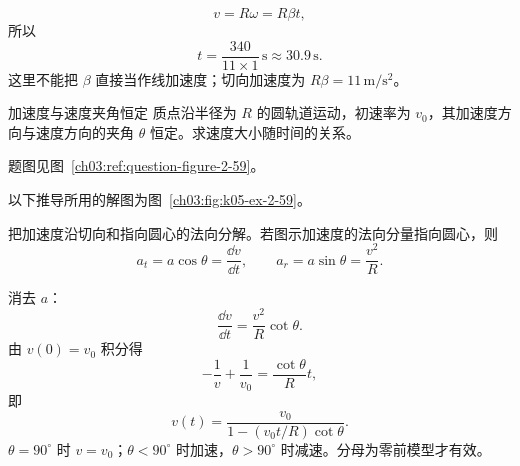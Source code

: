 {\begin{xesolution}
\[
v=R\omega=R\beta t,
\]
所以
\[
 \boxed{t=\frac{340}{11\times1}\,\mathrm s\approx30.9\,\mathrm s}.
\]
这里不能把 $\beta$ 直接当作线加速度；切向加速度为 $R\beta=11\,\mathrm{m/s^2}$。
\end{xesolution}


\begin{origexamplebox}{加速度与速度夹角恒定}\label{ch03:ex:k05-2-59}
质点沿半径为 $R$ 的圆轨道运动，初速率为 $v_0$，其加速度方向与速度方向的夹角 $\theta$ 恒定。求速度大小随时间的关系。
\par 题图见图~\ref{ch03:ref:question-figure-2-59}。
\KQuestionCH
\end{origexamplebox}
\begin{xesolution}
以下推导所用的解图为图~\ref{ch03:fig:k05-ex-2-59}。

把加速度沿切向和指向圆心的法向分解。若图示加速度的法向分量指向圆心，则
\[
a_t=a\cos\theta=\frac{\dd v}{\dd t},
\qquad
a_r=a\sin\theta=\frac{v^2}{R}.
\]
\AccelerationVelocityAngleDiagram

消去 $a$：
\[
\frac{\dd v}{\dd t}=\frac{v^2}{R}\cot\theta.
\]
由 $v(0)=v_0$ 积分得
\[
 -\frac1v+\frac1{v_0}=\frac{\cot\theta}{R}t,
\]
即
\[
 \boxed{v(t)=\frac{v_0}{1-(v_0t/R)\cot\theta}}.
\]
$\theta=90^\circ$ 时 $v=v_0$；$\theta<90^\circ$ 时加速，$\theta>90^\circ$ 时减速。分母为零前模型才有效。
\end{xesolution}
}

